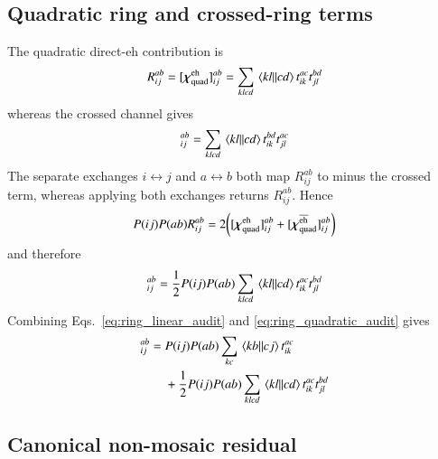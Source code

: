 \documentclass[aip,jcp,reprint,noshowkeys,superscriptaddress]{revtex4-1}
\newcommand{\eh}{\text{eh}}
\newcommand{\teh}{{\overline{\text{eh}}}}
\newcommand{\bchi}{\boldsymbol{\chi}}
\begin{document}
\subsection{Quadratic ring and crossed-ring terms}

The quadratic direct-$\eh$ contribution is
\begin{equation*}
    R_{ij}^{ab}
    =[\bchi^{\eh}_{\rm quad}]_{ij}^{ab}
    =
    \sum_{klcd}\mel{kl}{}{cd}t_{ik}^{ac}t_{jl}^{bd}
\end{equation*}
whereas the crossed channel gives
\begin{equation*}
    [\bchi^{\teh}_{\rm quad}]_{ij}^{ab}
    =
    \sum_{klcd}\mel{kl}{}{cd}t_{ik}^{bd}t_{jl}^{ac}
\end{equation*}
The separate exchanges $i\leftrightarrow j$ and $a\leftrightarrow b$ both
map $R_{ij}^{ab}$ to minus the crossed term, whereas applying both
exchanges returns $R_{ij}^{ab}$.  Hence
\begin{equation*}
    P(ij)P(ab)R_{ij}^{ab}
    =
    2\qty(
        [\bchi^{\eh}_{\rm quad}]_{ij}^{ab}
        +[\bchi^{\teh}_{\rm quad}]_{ij}^{ab}
    )
\end{equation*}
and therefore
\begin{equation}
    [\bchi^{\eh}_{\rm quad}+\bchi^{\teh}_{\rm quad}]_{ij}^{ab}
    =
    \frac12P(ij)P(ab)
    \sum_{klcd}\mel{kl}{}{cd}t_{ik}^{ac}t_{jl}^{bd}
    \label{eq:ring_quadratic_audit}
\end{equation}
Combining Eqs.~\eqref{eq:ring_linear_audit} and
\eqref{eq:ring_quadratic_audit} gives
\begin{align}
    [\bchi^{\eh}+\bchi^{\teh}]_{ij}^{ab}
    ={}&
    P(ij)P(ab)
    \sum_{kc}\mel{kb}{}{cj}t_{ik}^{ac}
    \nonumber\\
    &+
    \frac12P(ij)P(ab)
    \sum_{klcd}
    \mel{kl}{}{cd}t_{ik}^{ac}t_{jl}^{bd}
    \label{eq:ring_combined}
\end{align}

\subsection{Canonical non-mosaic residual}
\end{document}
